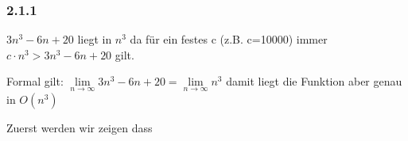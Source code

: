 \subsubsection*{2.1.1}
$3n^3 - 6n + 20$ liegt in $n^3$ da für ein festes c (z.B. c=10000) immer $c \cdot n^3 > 3n^3 - 6n + 20$ gilt.

Formal gilt: $ \lim\limits_{n \to \infty}3n^3-6n+20=\lim\limits_{n \to \infty}n^3 $ damit liegt die Funktion aber genau in $O(n^3)$

Zuerst werden wir zeigen dass
